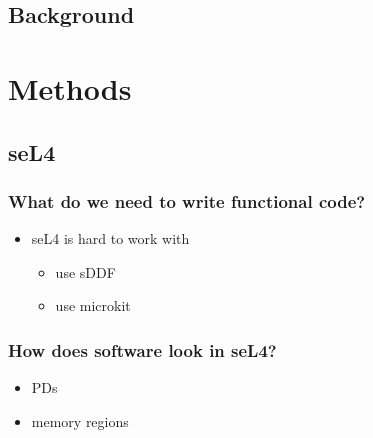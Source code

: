 \documentclass{beamer}
\begin{document}
\subsection{Background}

\section{Methods}
\subsection{seL4}
\begin{frame}
    \frametitle{What do we need to write functional code?}
    \begin{itemize}
        \item seL4 is hard to work with
            \begin{itemize}
                \item use sDDF
                \item use microkit
            \end{itemize}
    \end{itemize}
\end{frame}
\begin{frame}
    \frametitle{How does software look in seL4?}
    \begin{itemize}
        \item PDs
        \item memory regions
    \end{itemize}
\end{frame}
\end{document}
